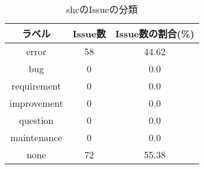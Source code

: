 \begin{table}[p] %
	\centering
	\caption{shcのIssueの分類}
	\label{tab:shc}
	\begin{tabular}{ccc} %
		\hline
		ラベル      & Issue数 & Issue数の割合(\%) \\\hline
		error       & 58      & 44.62             \\
		bug         & 0       & 0.0               \\
		requirement & 0       & 0.0               \\
		improvement & 0       & 0.0               \\
		question    & 0       & 0.0               \\
		maintenance & 0       & 0.0               \\
		none        & 72      & 55.38             \\\hline
	\end{tabular}
\end{table}





